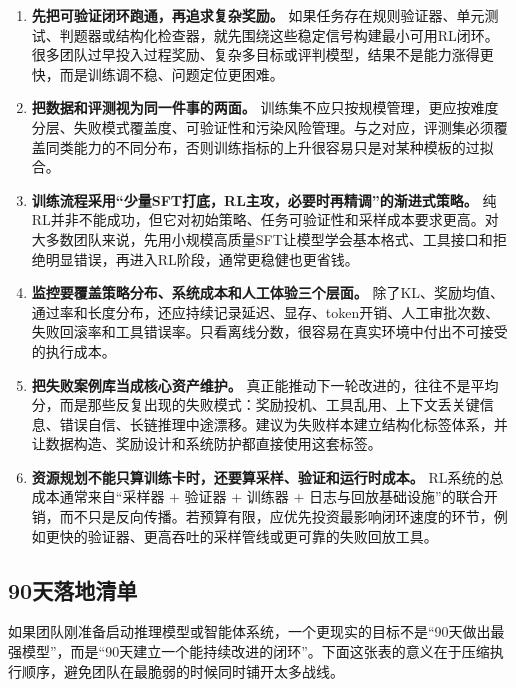 \documentclass[12pt,a4paper]{article}
\begin{document}
\begin{enumerate}
    \item \textbf{先把可验证闭环跑通，再追求复杂奖励。} 如果任务存在规则验证器、单元测试、判题器或结构化检查器，就先围绕这些稳定信号构建最小可用RL闭环。很多团队过早投入过程奖励、复杂多目标或评判模型，结果不是能力涨得更快，而是训练调不稳、问题定位更困难。
    
    \item \textbf{把数据和评测视为同一件事的两面。} 训练集不应只按规模管理，更应按难度分层、失败模式覆盖度、可验证性和污染风险管理。与之对应，评测集必须覆盖同类能力的不同分布，否则训练指标的上升很容易只是对某种模板的过拟合。
    
    \item \textbf{训练流程采用“少量SFT打底，RL主攻，必要时再精调”的渐进式策略。} 纯RL并非不能成功，但它对初始策略、任务可验证性和采样成本要求更高。对大多数团队来说，先用小规模高质量SFT让模型学会基本格式、工具接口和拒绝明显错误，再进入RL阶段，通常更稳健也更省钱。
    
    \item \textbf{监控要覆盖策略分布、系统成本和人工体验三个层面。} 除了KL、奖励均值、通过率和长度分布，还应持续记录延迟、显存、token开销、人工审批次数、失败回滚率和工具错误率。只看离线分数，很容易在真实环境中付出不可接受的执行成本。
    
    \item \textbf{把失败案例库当成核心资产维护。} 真正能推动下一轮改进的，往往不是平均分，而是那些反复出现的失败模式：奖励投机、工具乱用、上下文丢关键信息、错误自信、长链推理中途漂移。建议为失败样本建立结构化标签体系，并让数据构造、奖励设计和系统防护都直接使用这套标签。
    
    \item \textbf{资源规划不能只算训练卡时，还要算采样、验证和运行时成本。} RL系统的总成本通常来自“采样器 + 验证器 + 训练器 + 日志与回放基础设施”的联合开销，而不只是反向传播。若预算有限，应优先投资最影响闭环速度的环节，例如更快的验证器、更高吞吐的采样管线或更可靠的失败回放工具。
\end{enumerate}

\subsection{90天落地清单}

如果团队刚准备启动推理模型或智能体系统，一个更现实的目标不是“90天做出最强模型”，而是“90天建立一个能持续改进的闭环”。下面这张表的意义在于压缩执行顺序，避免团队在最脆弱的时候同时铺开太多战线。
\end{document}
